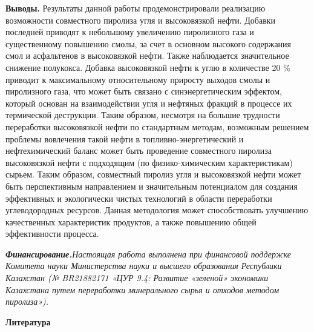 \begin{multicols}{2}
{\bfseries Выводы.} Результаты данной работы продемонстрировали реализацию
возможности совместного пиролиза угля и высоковязкой нефти. Добавки
последней приводят к небольшому увеличению пиролизного газа и
существенному повышению смолы, за счет в основном высокого содержания
смол и асфальтенов в высоковязкой нефти. Также наблюдается значительное
снижение полукокса. Добавка высоковязкой нефти к углю в количестве 20 \%
приводит к максимальному относительному приросту выходов смолы и
пиролизного газа, что может быть связано с синэнергетическим эффектом,
который основан на взаимодействии угля и нефтяных фракций в процессе их
термической деструкции. Таким образом, несмотря на большие трудности
переработки высоковязкой нефти по стандартным методам, возможным
решением проблемы вовлечения такой нефти в топливно-энергетический и
нефтехимический баланс может быть проведение совместного пиролиза
высоковязкой нефти с подходящим (по физико-химическим характеристикам)
сырьем. Таким образом, совместный пиролиз угля и высоковязкой нефти
может быть перспективным направлением и значительным потенциалом для
создания эффективных и экологически чистых технологий в области
переработки углеводородных ресурсов. Данная методология может
способствовать улучшению качественных характеристик продуктов, а также
повышению общей эффективности процесса.

\emph{{\bfseries Финансирование.}Настоящая работа выполнена при финансовой
поддержке Комитета науки Министерства науки и высшего образования
Республики Казахстан (№ BR21882171 «ЦУР 9.4: Развитие «зеленой»
экономики Казахстана путем переработки минерального сырья и отходов
методом пиролиза»).}
\end{multicols}

\begin{center}
{\bfseries Литература}
\end{center}

